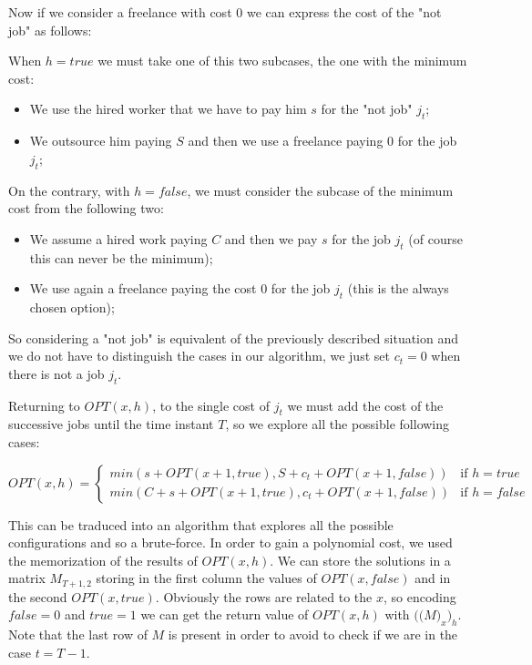 \documentclass[paper=a4, fontsize=11pt]{scrartcl} %
\numberwithin{equation}{section} %
\numberwithin{figure}{section} %
\numberwithin{table}{section} %
\begin{document}
Now if we consider a freelance with cost $0$ we can express the cost of the "not job" as follows:

When $h = true$ we must take one of this two subcases, the one with the minimum cost:
\begin{itemize}
    \item We use the hired worker that we have to pay him $s$ for the "not job" $j_t$;
    \item We outsource him paying $S$ and then we use a freelance paying 0 for the job $j_t$;
\end{itemize}
On the contrary, with $h = false$, we must consider the subcase of the minimum cost from the following two:
\begin{itemize}
    \item We assume a hired work paying $C$ and then we pay $s$ for the job $j_t$ (of course this can never be the minimum);
    \item We use again a freelance paying the cost 0 for the job $j_t$ (this is the always chosen option);
\end{itemize}

So considering a "not job" is equivalent of the previously described situation and we do not have to distinguish the cases in our algorithm, we just set $c_t = 0$ when there is not a job $j_t$.

Returning to $OPT(x, h)$, to the single cost of $j_t$ we must add the cost of the successive jobs until the time instant $T$, so we explore all the possible following cases:

\[
    OPT(x, h) = 
    \begin{cases}
        min(s + OPT(x+1, true), S + c_t + OPT(x+1, false)) & \text{if } h = true \\
        min(C + s + OPT(x+1, true), c_t + OPT(x+1, false)) & \text{if } h = false
    \end{cases}
\]

This can be traduced into an algorithm that explores all the possible configurations and so a brute-force. In order to gain a polynomial cost, we used the memorization of the results of $OPT(x, h)$.
We can store the solutions in a matrix $M_{T+1,2}$ storing in the first column the values of $OPT(x, false)$ and in the second $OPT(x, true)$. Obviously the rows are related to the $x$, so encoding $false = 0$ and $true = 1$ we can get the return value of $OPT(x, h)$ with $\big(\big(M\big)_x\big)_h$. Note that the last row of $M$ is present in order to avoid to check if we are in the case $t = T-1$.
\end{document}
